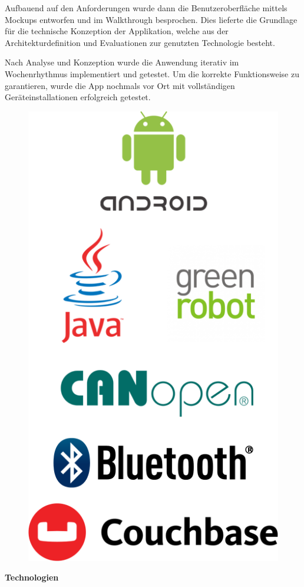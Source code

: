 Aufbauend auf den Anforderungen wurde dann die Benutzeroberfläche mittels Mockups entworfen und im Walkthrough besprochen. Dies lieferte die Grundlage für die technische Konzeption der Applikation, welche aus der Architekturdefinition und Evaluationen zur genutzten Technologie besteht.

Nach Analyse und Konzeption wurde die Anwendung iterativ im Wochenrhythmus implementiert und getestet. Um die korrekte Funktionsweise zu garantieren, wurde die App nochmals vor Ort mit vollständigen Geräteinstallationen erfolgreich getestet.

\begin{figure}
	\includegraphics[scale=0.26]{start/img/logos}
\end{figure}
\textbf{Technologien}

